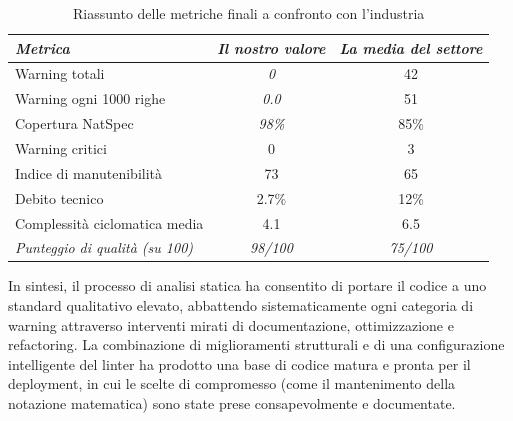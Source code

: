 \begin{table}[H]
\centering
\caption{Riassunto delle metriche finali a confronto con l'industria}
\label{tab:metriche-finali}
\begin{tabular}{lcc}
\toprule
\textit{Metrica} & \textit{Il nostro valore} & \textit{La media del settore} \\
\midrule
Warning totali & \textit{0} & 42 \\
Warning ogni 1000 righe & \textit{0.0} & 51 \\
Copertura NatSpec & \textit{98\%} & 85\% \\
Warning critici & 0 & 3 \\
Indice di manutenibilità & 73 & 65 \\
Debito tecnico & 2.7\% & 12\% \\
Complessità ciclomatica media & 4.1 & 6.5 \\
\midrule
\textit{Punteggio di qualità (su 100)} & \textit{98/100} & \textit{75/100} \\
\bottomrule
\end{tabular}
\end{table}

In sintesi, il processo di analisi statica ha consentito di portare il codice a uno standard qualitativo elevato, abbattendo sistematicamente ogni categoria di warning attraverso interventi mirati di documentazione, ottimizzazione e refactoring. La combinazione di miglioramenti strutturali e di una configurazione intelligente del linter ha prodotto una base di codice matura e pronta per il deployment, in cui le scelte di compromesso (come il mantenimento della notazione matematica) sono state prese consapevolmente e documentate.
